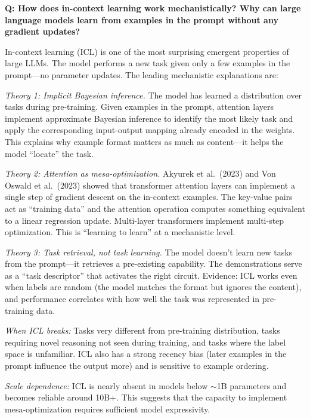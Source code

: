 \begin{interviewq}
\textbf{Q: How does in-context learning work mechanistically? Why can large language models learn from examples in the prompt without any gradient updates?}

 \quad {} \quad \badgefreq{\freqlow}

\stronganswer In-context learning (ICL) is one of the most surprising emergent properties of large LLMs. The model performs a new task given only a few examples in the prompt---no parameter updates. The leading mechanistic explanations are:

\textit{Theory 1: Implicit Bayesian inference.} The model has learned a distribution over tasks during pre-training. Given examples in the prompt, attention layers implement approximate Bayesian inference to identify the most likely task and apply the corresponding input-output mapping already encoded in the weights. This explains why example format matters as much as content---it helps the model ``locate'' the task.

\textit{Theory 2: Attention as mesa-optimization.} Akyurek et al.\ (2023) and Von Oswald et al.\ (2023) showed that transformer attention layers can implement a single step of gradient descent on the in-context examples. The key-value pairs act as ``training data'' and the attention operation computes something equivalent to a linear regression update. Multi-layer transformers implement multi-step optimization. This is ``learning to learn'' at a mechanistic level.

\textit{Theory 3: Task retrieval, not task learning.} The model doesn't learn new tasks from the prompt---it retrieves a pre-existing capability. The demonstrations serve as a ``task descriptor'' that activates the right circuit. Evidence: ICL works even when labels are random (the model matches the format but ignores the content), and performance correlates with how well the task was represented in pre-training data.

\textit{When ICL breaks:} Tasks very different from pre-training distribution, tasks requiring novel reasoning not seen during training, and tasks where the label space is unfamiliar. ICL also has a strong recency bias (later examples in the prompt influence the output more) and is sensitive to example ordering.

\textit{Scale dependence:} ICL is nearly absent in models below $\sim$1B parameters and becomes reliable around 10B+. This suggests that the capacity to implement mesa-optimization requires sufficient model expressivity.


\end{interviewq}
